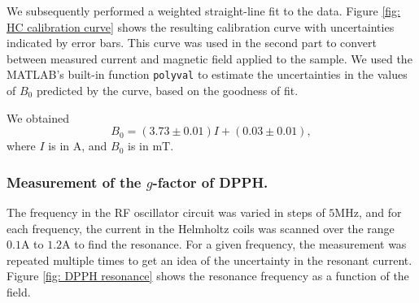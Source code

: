 \documentclass[a4paper]{jpconf}
\numberwithin{equation}{section}
\begin{document}
We subsequently performed a weighted straight-line fit to the data. Figure \ref{fig: HC calibration curve} shows the resulting calibration curve with uncertainties indicated by error bars. This curve was used in the second part to convert between measured current and magnetic field applied to the sample. We used the MATLAB's built-in function \texttt{polyval} to estimate the uncertainties in the values of $B_0$ predicted by the curve, based on the goodness of fit.

We obtained 
\[
	B_0 = (3.73 \pm 0.01) I + (0.03 \pm 0.01),
\]
where $I$ is in $\si{\ampere}$, and $B_0$ is in $\si{\milli\tesla}$.

\subsubsection{Measurement of the $g$-factor of DPPH.}
The frequency in the RF oscillator circuit was varied in steps of $5 \si{\mega\hertz}$, and for each frequency, the current in the Helmholtz coils was scanned over the range $0.1 \si{\ampere}$ to $1.2 \si{\ampere}$ to find the resonance. For a given frequency, the measurement was repeated multiple times to get an idea of the uncertainty in the resonant current. Figure \ref{fig: DPPH resonance} shows the resonance frequency as a function of the field.
\end{document}
